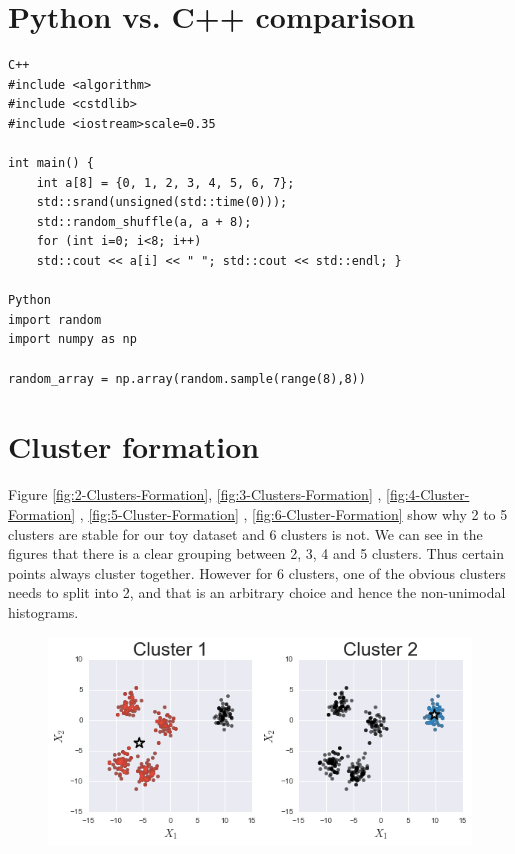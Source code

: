\documentclass[10pt,twocolumn,letterpaper]{article}
\begin{document}
\begin{appendices}

\section{Python vs. C++ comparison} \label{py-compare} 

\begin{verbatim}
C++
#include <algorithm>
#include <cstdlib>
#include <iostream>scale=0.35

int main() {
    int a[8] = {0, 1, 2, 3, 4, 5, 6, 7};     
	std::srand(unsigned(std::time(0)));
    std::random_shuffle(a, a + 8);
    for (int i=0; i<8; i++)         
	std::cout << a[i] << " "; std::cout << std::endl; }

Python 
import random
import numpy as np

random_array = np.array(random.sample(range(8),8))
\end{verbatim}

\section{Cluster formation} \label{cluster-formation}

Figure \ref{fig:2-Clusters-Formation}, \ref{fig:3-Clusters-Formation}
, \ref{fig:4-Cluster-Formation} , \ref{fig:5-Cluster-Formation}
, \ref{fig:6-Cluster-Formation} show why 2 to 5 clusters are stable
for our toy dataset and 6 clusters is not. We can see in the figures
that there is a clear grouping between 2, 3, 4 and 5 clusters. Thus
certain points always cluster together. However for 6 clusters, one
of the obvious clusters needs to split into 2, and that is an arbitrary
choice and hence the non-unimodal histograms.

\begin{figure}[htbp] 
\begin{center}
\includegraphics[scale=0.65]{figure/2_formation.png}
\end{center}


\end{figure}
\end{appendices}
\end{document}
